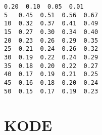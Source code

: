 \documentclass[11pt]{article}
\makeatletter
\newcommand{\boxspacing}{\kern\kvtcb@left@rule\kern\kvtcb@boxsep}
\newcommand{\prompt}[4]{
        {\ttfamily\llap{{\color{#2}[#3]:\hspace{3pt}#4}}\vspace{-\baselineskip}}
    }
\makeatother
\begin{document}
            \begin{tcolorbox}[breakable, size=fbox, boxrule=.5pt, pad at break*=1mm, opacityfill=0]
\prompt{Out}{outcolor}{ }{\boxspacing}
\begin{Verbatim}[commandchars=\\\{\}]
    0.20  0.10  0.05  0.01
5   0.45  0.51  0.56  0.67
10  0.32  0.37  0.41  0.49
15  0.27  0.30  0.34  0.40
20  0.23  0.26  0.29  0.35
25  0.21  0.24  0.26  0.32
30  0.19  0.22  0.24  0.29
35  0.18  0.20  0.22  0.27
40  0.17  0.19  0.21  0.25
45  0.16  0.18  0.20  0.24
50  0.15  0.17  0.19  0.23
\end{Verbatim}
\end{tcolorbox}
        
    \hypertarget{kode}{%
\section{KODE}\label{kode}}
\end{document}
